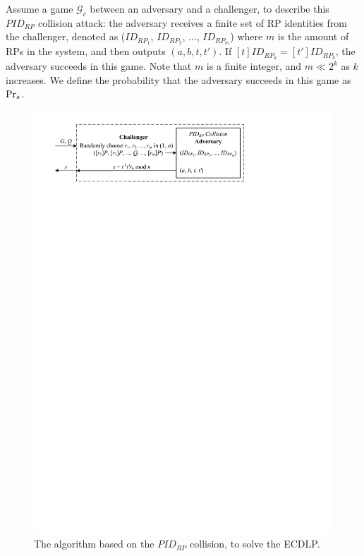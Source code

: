 Assume a game $\mathcal{G}_c$ between an adversary and a challenger,
    to describe this $PID_{RP}$ collision attack:
the adversary receives a finite set of RP identities from the challenger,
 denoted as ($ID_{RP_1}$, $ID_{RP_2}$, ..., $ID_{RP_m}$)
 where $m$ is the amount of RPs in the system,
  and then outputs $(a, b, t, t')$.
If $[t]ID_{RP_a}=[t']ID_{RP_b}$, the adversary succeeds in this game.
Note that $m$ is a finite integer, and $m \ll 2^k$ as $k$ increases.
We define the probability that the adversary succeeds in this game as ${\rm Pr}_s$.


\begin{figure}[tb]
  \centering
  \includegraphics[width=0.96\linewidth]{fig/ecdlp_algorithm.pdf}
  \caption{The algorithm based on the $PID_{RP}$ collision, to solve the ECDLP.}
  \label{fig:ecdlp_algorithm}
\end{figure}


